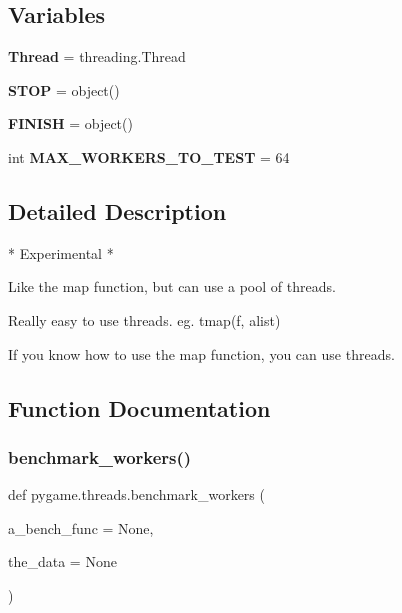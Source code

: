 \subsection*{Variables}
\begin{DoxyCompactItemize}
\item 
\mbox{\label{namespacepygame_1_1threads_a1c2180d4c7b0bc5753a2b128e7db59ef}} 
{\bfseries Thread} = threading.\+Thread
\item 
\mbox{\label{namespacepygame_1_1threads_a4dfae11edb5f99b75da15ef625aa491a}} 
{\bfseries S\+T\+OP} = object()
\item 
\mbox{\label{namespacepygame_1_1threads_a8a5a5f2774bfd092691f0d7428f0d698}} 
{\bfseries F\+I\+N\+I\+SH} = object()
\item 
\mbox{\label{namespacepygame_1_1threads_a72b06c890749e6b15de24315d9682f05}} 
int {\bfseries M\+A\+X\+\_\+\+W\+O\+R\+K\+E\+R\+S\+\_\+\+T\+O\+\_\+\+T\+E\+ST} = 64
\end{DoxyCompactItemize}


\subsection{Detailed Description}
\begin{DoxyVerb}* Experimental *

Like the map function, but can use a pool of threads.

Really easy to use threads.  eg.  tmap(f, alist)

If you know how to use the map function, you can use threads.
\end{DoxyVerb}
 

\subsection{Function Documentation}
\mbox{\label{namespacepygame_1_1threads_af5a9cff0c554b4f8b31b1ee47e616213}} 
\subsubsection{\texorpdfstring{benchmark\+\_\+workers()}{benchmark\_workers()}}
{\footnotesize\ttfamily def pygame.\+threads.\+benchmark\+\_\+workers (\begin{DoxyParamCaption}\item[{}]{a\+\_\+bench\+\_\+func = {\ttfamily None},  }\item[{}]{the\+\_\+data = {\ttfamily None} }\end{DoxyParamCaption})}

